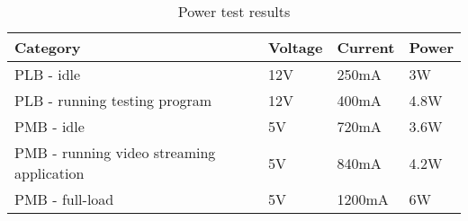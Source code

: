 \begin{table}[H]
    \caption{Power test results}
	\centering
	\begin{tabular}{llll}
	\hline
	\textbf{Category} & \textbf{Voltage} & \textbf{Current} & \textbf{Power} \\
	\hline
    PLB - idle & 12V & 250mA & 3W\\
    PLB - running testing program & 12V & 400mA & 4.8W\\
    PMB - idle & 5V & 720mA & 3.6W\\
    PMB - running video streaming application & 5V & 840mA & 4.2W\\
    PMB - full-load & 5V & 1200mA & 6W\\
	\hline
	\end{tabular}
\end{table}